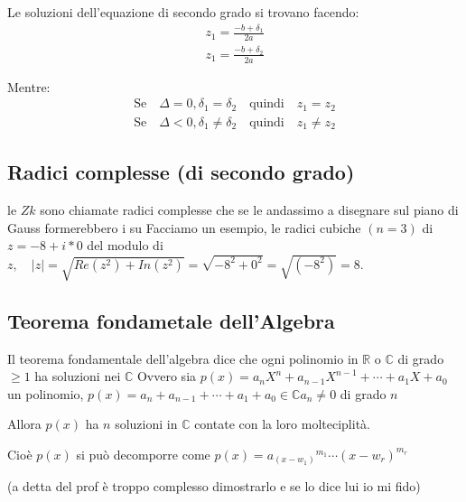 \documentclass{article}
\begin{document}
Le soluzioni dell'equazione di secondo grado si trovano facendo:
\begin{align}
        z_1 = \frac{-b + \delta_1}{2a} \\
        z_1 = \frac{-b + \delta_2}{2a} 
\end{align}

Mentre:
\begin{align}
        \mbox{Se} \quad \Delta = 0, \delta_1=\delta_2 \quad \mbox{quindi} \quad z_1=z_2 \\
        \mbox{Se} \quad \Delta < 0, \delta_1 \not = \delta_2 \quad \mbox{quindi} \quad z_1 \not = z_2 
\end{align}



\subsection{Radici complesse (di secondo grado)}
le $Zk$ sono chiamate radici complesse che se le andassimo a disegnare sul piano di Gauss formerebbero i su \newline
Facciamo un esempio, le radici cubiche $(n=3)$ di $z = -8 +i*0$ del modulo di $z, \quad|z| = \sqrt{Re(z^2)+In(z^2)} = \sqrt{-8^2 + 0^2} = \sqrt{(-8^2)} = 8$.



\subsection{Teorema fondametale dell'Algebra}
Il teorema fondamentale dell'algebra dice che ogni polinomio in $\mathbb{R}$ o $\mathbb{C}$ di grado $\geq 1$ ha soluzioni nei $\mathbb{C}$ \newline 
Ovvero sia $p(x) = a_n X^n + a_{n-1} X^{n-1} + \cdots + a_1 X + a_0$ un polinomio, $p(x) = a_n  + a_{n-1} + \cdots + a_1 + a_0 \in \mathbb{C} a_n \not = 0$ di grado $n$ \par
Allora $p(x)$ ha $n$ soluzioni in $\mathbb{C}$ contate con la loro molteciplità.\par
Cioè $p(x)$ si può decomporre come $p(x) = {a_(x-w_1)}^{m_1} \cdots {(x-w_r)}^{m_r}$ \newline

(a detta del prof è troppo complesso dimostrarlo e se lo dice lui io mi fido)







\newpage
\end{document}
